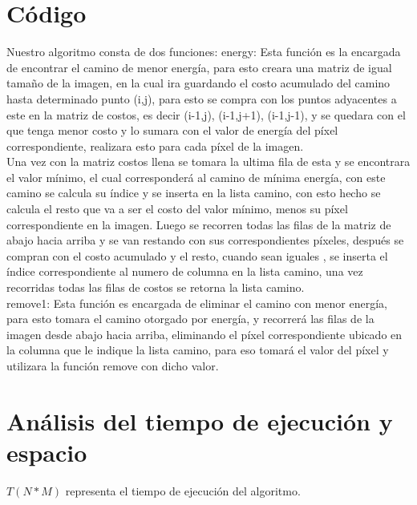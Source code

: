 \documentclass[twocolumn,11pts]{IEEEtran}
\begin{document}
\section{Código}
Nuestro algoritmo consta de dos funciones:
energy: Esta función es la encargada de encontrar el camino de menor energía, para esto creara una matriz de igual tamaño de la imagen, en la cual ira guardando el costo acumulado del camino hasta determinado punto (i,j), para esto se compra con los puntos adyacentes a este en la matriz de costos, es decir (i-1,j), (i-1,j+1), (i-1,j-1), y se quedara con el que tenga menor costo y lo sumara con el valor de energía del píxel correspondiente, realizara esto para cada píxel de la imagen.\\
Una vez con la matriz costos llena se tomara la ultima fila de esta y se encontrara el valor mínimo, el cual corresponderá al camino de mínima energía, con este camino se calcula su índice y se inserta en la lista camino, con esto hecho se calcula el resto que va a ser el costo del valor mínimo, menos su píxel correspondiente en la imagen. Luego se recorren todas las filas de la matriz de abajo hacia arriba y se van restando con sus correspondientes píxeles, después  se compran con el costo acumulado y el resto, cuando sean iguales , se inserta el índice correspondiente al numero de columna en la lista camino, una vez recorridas todas las filas de costos se retorna la lista camino.\\
remove1: Esta función es encargada de eliminar el camino con menor energía, para esto tomara el camino otorgado por energía, y recorrerá las filas de la imagen desde abajo hacia arriba, eliminando el píxel correspondiente ubicado en la columna que le indique la lista camino, para eso tomará el valor del píxel y utilizara la función remove con dicho valor.



\section{Análisis del tiempo de ejecución y espacio}
$T(N*M)$ representa el tiempo de ejecución del algoritmo.\\\\
\end{document}

